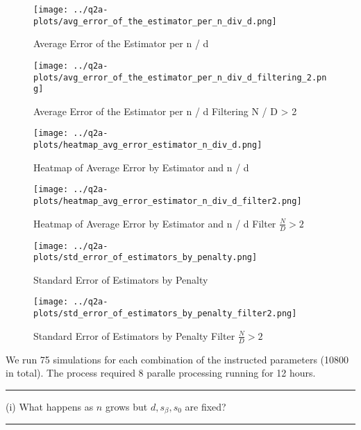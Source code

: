 \documentclass{article}
\newenvironment{colorparagraph}[1]{\par\color{#1}}{\par}
\begin{document}
{%
\begin{figure}[H]
  \centering
  \texttt{[image: ../q2a-plots/avg\_error\_of\_the\_estimator\_per\_n\_div\_d.png]}
  \caption{Average Error of the Estimator per n / d}
\end{figure}

\begin{figure}[H]
  \centering
  \texttt{[image: ../q2a-plots/avg\_error\_of\_the\_estimator\_per\_n\_div\_d\_filtering\_2.png]}
  \caption{Average Error of the Estimator per n / d Filtering N / D > 2}
\end{figure}

\begin{figure}[H]
  \centering
  \texttt{[image: ../q2a-plots/heatmap\_avg\_error\_estimator\_n\_div\_d.png]}
  \caption{Heatmap of Average Error by Estimator and n / d}
\end{figure}

\begin{figure}[H]
  \centering
  \texttt{[image: ../q2a-plots/heatmap\_avg\_error\_estimator\_n\_div\_d\_filter2.png]}
  \caption{Heatmap of Average Error by Estimator and n / d Filter $\frac{N}{D} > 2$}
\end{figure}

\begin{figure}[H]
  \centering
  \texttt{[image: ../q2a-plots/std\_error\_of\_estimators\_by\_penalty.png]}
  \caption{Standard Error of Estimators by Penalty}
\end{figure}

\begin{figure}[H]
  \centering
  \texttt{[image: ../q2a-plots/std\_error\_of\_estimators\_by\_penalty\_filter2.png]}
  \caption{Standard Error of Estimators by Penalty Filter $\frac{N}{D} > 2$}
\end{figure}

}{}

We run 75 simulations for each combination of the instructed parameters (10800 in total). The process required 8 paralle processing running for 12 hours.

\begin{colorparagraph}{questioncolor}
  \rule{\textwidth}{0.5pt}
  
  \vspace{.2cm}
  (i) What happens as \( n \) grows but \( d, s_\beta, s_0 \) are fixed?

  \rule{\textwidth}{0.5pt}
\end{colorparagraph}
\end{document}
